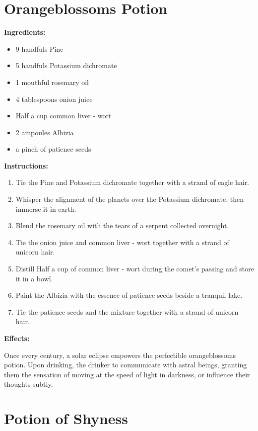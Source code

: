 \documentclass{article}
\begin{document}
\newpage
\section*{Orangeblossoms Potion}

\textbf{Ingredients:}

\begin{itemize}
  \item 9 handfuls Pine
  \item 5 handfuls Potassium dichromate
  \item 1 mouthful rosemary oil
  \item 4 tablespoons onion juice
  \item Half a cup common liver - wort
  \item 2 ampoules Albizia
  \item a pinch of patience seeds
\end{itemize}

\textbf{Instructions:}

\begin{enumerate}
  \item Tie the Pine and Potassium dichromate together with a strand of eagle hair.
  \item Whisper the alignment of the planets over the Potassium dichromate, then immerse it in earth.
  \item Blend the rosemary oil with the tears of a serpent collected overnight.
  \item Tie the onion juice and common liver - wort together with a strand of unicorn hair.
  \item Distill Half a cup of common liver - wort during the comet’s passing and store it in a bowl.
  \item Paint the Albizia with the essence of patience seeds beside a tranquil lake.
  \item Tie the patience seeds and the mixture together with a strand of unicorn hair.
\end{enumerate}

\textbf{Effects:}

Once every century, a solar eclipse empowers the perfectible orangeblossoms potion. Upon drinking, the drinker to communicate with astral beings, granting them the sensation of moving at the speed of light in darkness, or influence their thoughts subtly.

\newpage
\section*{Potion of Shyness}
\end{document}
